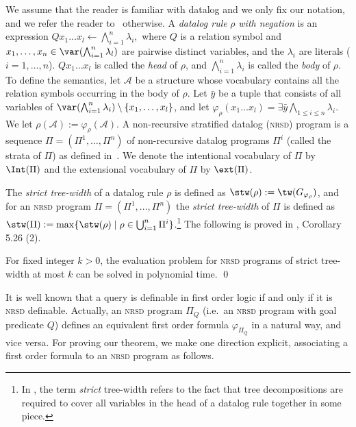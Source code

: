 \documentclass{LMCS}
\newcommand{\nrsd}{\textsc{nrsd}}
\renewcommand{\phi}{\varphi}
\begin{document}
We assume that the reader is familiar with datalog and we only 
fix our notation, and we refer the reader to~\cite{flufrigro01}
otherwise.
A \emph{datalog rule} $\rho$ \emph{with negation} is an expression 
$
	Qx_1\ldots x_l\leftarrow\bigwedge_{i=1}^n\lambda_i,
$ 
where $Q$ is a relation symbol and $x_1,\ldots ,x_n\in\var(\bigwedge_{i=1}^n\lambda_l)$ 
are pairwise distinct variables, and the $\lambda_i$ are literals
($i=1,\ldots ,n$). $Qx_1\ldots x_l$ is called the \emph{head} of
$\rho$, and $\bigwedge_{i=1}^n\lambda_i$ is called the \emph{body} of
$\rho$. To define the semantics, let $\mathcal A$ be a structure
whose vocabulary contains all the relation symbols occurring in the body
of $\rho$. Let $\bar y$ be a tuple that consists of all variables 
of $\var(\bigwedge_{i=1}^n\lambda_i)\setminus\{x_1,\ldots,x_l\}$,
and let 
$\phi_{\rho}(x_1\ldots x_l)=\exists\bar y\bigwedge_{1\leq i\leq n}\lambda_i$.
We let $\rho(\mathcal A):=\phi_{\rho}(\mathcal A)$.
A non-recursive stratified datalog 
(\nrsd{}) program is a sequence $\Pi=(\Pi^1,\ldots,\Pi^n)$
of non-recursive datalog programs $\Pi^i$ (called the strata of $\Pi$) 
as defined in~\cite{flufrigro01}. 
We denote the intentional vocabulary of $\Pi$ by $\Int(\Pi)$
and the extensional vocabulary of $\Pi$ by $\ext(\Pi)$.


The \emph{strict tree-width} of a datalog rule 
$\rho$ is defined as $\stw(\rho):=\tw(G_{\phi_{\rho}})$, and for 
an \nrsd{} program $\Pi=(\Pi^1,\ldots,\Pi^n)$ the \emph{strict tree-width} of
$\Pi$ is defined as $\stw(\Pi):=\max\{\stw(\rho)\mid\rho\in \bigcup_{i=1}^n\Pi^i\}$.\footnote{In \cite{flufrigro01}, the term \emph{strict} tree-width refers to the fact 
that tree decompositions are required
to cover all variables in the head of a datalog rule together in some piece.}
The following is proved in \cite{flufrigro01}, Corollary 5.26 (2).
\begin{thm}
	For fixed integer $k>0$, the evaluation problem for \nrsd{} programs
	of strict tree-width at most $k$ can be solved in polynomial time.
\qed\end{thm}

It is well known that a query is definable in first order logic if and only
if it is \nrsd{} definable. Actually, an \nrsd{} program $\Pi_Q$ (i.e.\ an
\nrsd{} program with goal predicate $Q$) defines
an equivalent first order formula $\phi_{\Pi_Q}$ in a natural way, and 
vice versa.
For proving our theorem, we make one direction explicit, 
associating a first order formula to 
an \nrsd{} program as follows. 
\end{document}
